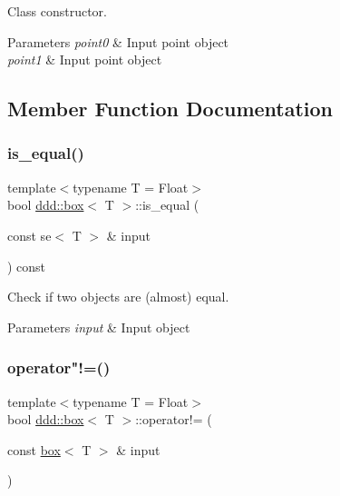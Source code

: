 Class constructor. 


\begin{DoxyParams}{Parameters}
{\em point0} & Input point object \\
\hline
{\em point1} & Input point object \\
\hline
\end{DoxyParams}


\subsection{Member Function Documentation}
\mbox{\label{classddd_1_1box_ad7a33142f2d50b8d9e49d8ea089bdf7a}} 
\subsubsection{\texorpdfstring{is\+\_\+equal()}{is\_equal()}}
{\footnotesize\ttfamily template$<$typename T = Float$>$ \\
bool \hyperlink{classddd_1_1box}{ddd\+::box}$<$ T $>$\+::is\+\_\+equal (\begin{DoxyParamCaption}\item[{const se$<$ T $>$ \&}]{input }\end{DoxyParamCaption}) const\hspace{0.3cm}{\ttfamily [inline]}}



Check if two objects are (almost) equal. 


\begin{DoxyParams}{Parameters}
{\em input} & Input object \\
\hline
\end{DoxyParams}
\mbox{\label{classddd_1_1box_a2022b401ce06dc71649424da5cfeb604}} 
\subsubsection{\texorpdfstring{operator"!=()}{operator!=()}}
{\footnotesize\ttfamily template$<$typename T = Float$>$ \\
bool \hyperlink{classddd_1_1box}{ddd\+::box}$<$ T $>$\+::operator!= (\begin{DoxyParamCaption}\item[{const \hyperlink{classddd_1_1box}{box}$<$ T $>$ \&}]{input }\end{DoxyParamCaption})\hspace{0.3cm}{\ttfamily [inline]}}



